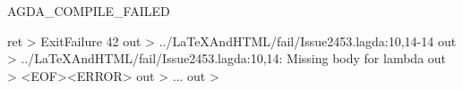 AGDA_COMPILE_FAILED

ret > ExitFailure 42 out > ../LaTeXAndHTML/fail/Issue2453.lagda:10,14-14 out > ../LaTeXAndHTML/fail/Issue2453.lagda:10,14: Missing body for lambda out > <EOF><ERROR> out > ... out >